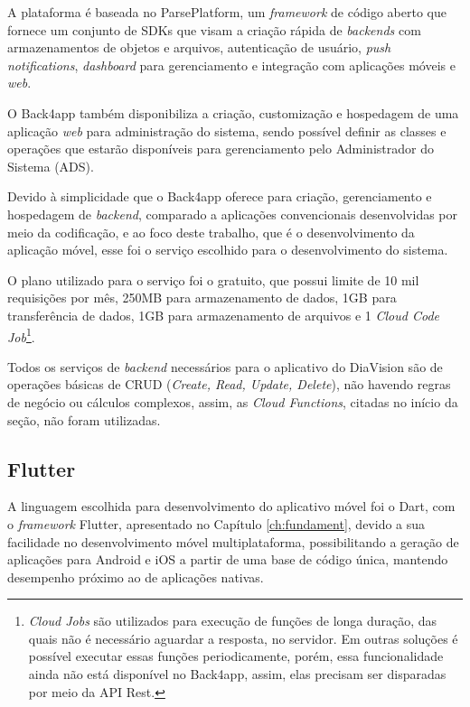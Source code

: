 A plataforma é baseada no ParsePlatform, um \emph{framework} de código aberto que fornece um conjunto de SDKs que visam a criação rápida de \emph{backends}
com armazenamentos de objetos e arquivos, autenticação de usuário, \emph{push notifications}, \emph{dashboard} para gerenciamento e integração com aplicações móveis e \emph{web}.

O Back4app também disponibiliza a criação, customização e hospedagem de uma aplicação \emph{web} para administração do sistema,
sendo possível definir as classes e operações que estarão disponíveis para gerenciamento pelo Administrador do Sistema (ADS).

Devido à simplicidade que o Back4app oferece para criação, gerenciamento e hospedagem de \emph{backend}, comparado
a aplicações convencionais desenvolvidas por meio da codificação, e ao foco deste trabalho, que é o
desenvolvimento da aplicação móvel, esse foi o serviço escolhido para o desenvolvimento do sistema.

O plano utilizado para o serviço foi o gratuito, que possui limite de 10 mil requisições por mês, 250MB para armazenamento de dados,
1GB para transferência de dados, 1GB para armazenamento de arquivos e 1 \emph{Cloud Code Job}\footnote{\emph{Cloud Jobs} são utilizados
    para execução de funções de longa duração, das quais não é necessário aguardar a resposta, no servidor. Em outras soluções é possível
    executar essas funções periodicamente, porém, essa funcionalidade ainda não está disponível no Back4app, assim, elas precisam ser disparadas
    por meio da API Rest.}.

Todos os serviços de \emph{backend} necessários para o aplicativo do DiaVision são de operações básicas de CRUD (\emph{Create, Read, Update, Delete}),
não havendo regras de negócio ou cálculos complexos, assim, as \emph{Cloud Functions}, citadas no início da seção, não foram utilizadas.

\subsection{Flutter}

A linguagem escolhida para desenvolvimento do aplicativo móvel foi o Dart, com o \emph{framework} Flutter, apresentado
no Capítulo \ref{ch:fundament}, devido a sua facilidade no desenvolvimento móvel multiplataforma, possibilitando a geração
de aplicações para Android e iOS a partir de uma base de código única, mantendo desempenho próximo ao de aplicações nativas.


